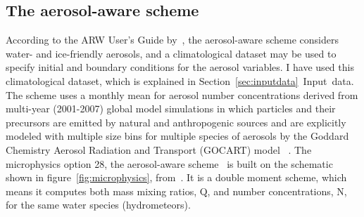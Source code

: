 \subsection{The aerosol-aware scheme}
According to the ARW User's Guide by~\citet{Wang2015}, the aerosol-aware scheme considers water- and ice-friendly aerosols, and a climatological dataset may be used to specify initial and boundary conditions for the aerosol variables. I have used this climatological dataset, which is explained in Section~\ref{sec:inputdata}~Input~data. The scheme uses a monthly mean for aerosol number concentrations derived from multi-year (2001-2007) global model simulations %
in which particles and their precursors are emitted by natural and anthropogenic sources and are explicitly modeled with multiple size bins for multiple species of aerosols by the Goddard Chemistry Aerosol Radiation and Transport (GOCART) model %
~\citep{Thompson2014}.
The microphysics option 28, the aerosol-aware scheme~\citep{Thompson2014} is built on the schematic shown in figure~\ref{fig:microphysics}, from~\citet{Reisner1998}. It is a double moment scheme, which means it computes both mass mixing ratios, Q, and number concentrations, N, for the same water species (hydrometeors). 

